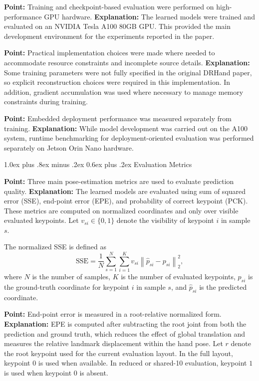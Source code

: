 \documentclass[10pt,letterpaper]{article}
\makeatletter
\renewcommand\subsection{\@startsection{subsection}{2}{\z@}%
  {1.0ex plus .8ex minus .2ex}%
  {0.6ex plus .2ex}%
  {\normalfont\itshape}}
\makeatother
\begin{document}
\medskip
\noindent\textbf{Point:} Training and checkpoint-based evaluation were performed on high-performance GPU hardware.  
\textbf{Explanation:} The learned models were trained and evaluated on an NVIDIA Tesla A100 80GB GPU. This provided the main development environment for the experiments reported in the paper.

\medskip
\noindent\textbf{Point:} Practical implementation choices were made where needed to accommodate resource constraints and incomplete source details.  
\textbf{Explanation:} Some training parameters were not fully specified in the original DRHand paper, so explicit reconstruction choices were required in this implementation. In addition, gradient accumulation was used where necessary to manage memory constraints during training.

\medskip
\noindent\textbf{Point:} Embedded deployment performance was measured separately from training.  
\textbf{Explanation:} While model development was carried out on the A100 system, runtime benchmarking for deployment-oriented evaluation was performed separately on Jetson Orin Nano hardware.

\subsection{Evaluation Metrics}

\noindent\textbf{Point:} Three main pose-estimation metrics are used to evaluate prediction quality.  
\textbf{Explanation:} The learned models are evaluated using sum of squared error (SSE), end-point error (EPE), and probability of correct keypoint (PCK). These metrics are computed on normalized coordinates and only over visible evaluated keypoints. Let $v_{si} \in \{0,1\}$ denote the visibility of keypoint $i$ in sample $s$.

The normalized SSE is defined as
\[
\mathrm{SSE} =
\frac{1}{N}
\sum_{s=1}^{N}
\sum_{i=1}^{K}
v_{si}\left\|
\hat{p}_{si} - p_{si}
\right\|_2^2,
\]
where $N$ is the number of samples, $K$ is the number of evaluated keypoints, $p_{si}$ is the ground-truth coordinate for keypoint $i$ in sample $s$, and $\hat{p}_{si}$ is the predicted coordinate.

\medskip
\noindent\textbf{Point:} End-point error is measured in a root-relative normalized form.  
\textbf{Explanation:} EPE is computed after subtracting the root joint from both the prediction and ground truth, which reduces the effect of global translation and measures the relative landmark displacement within the hand pose. Let $r$ denote the root keypoint used for the current evaluation layout. In the full layout, keypoint $0$ is used when available. In reduced or shared-10 evaluation, keypoint $1$ is used when keypoint $0$ is absent.
\end{document}
